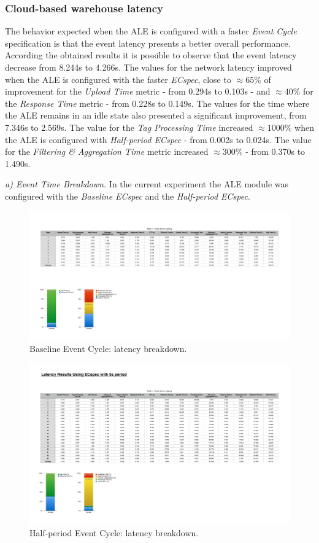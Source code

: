 \subsubsection{Cloud-based warehouse latency}
\label{subs:eval_exp_latency_ecspec_fast}
The behavior expected when the \gls{ALE} is configured with a faster \textit{Event Cycle} specification
is that the event latency presents a better overall performance. According the obtained results it is possible
to observe that the event latency decrease from 8.244s to 4.266s. The values for the network latency
improved when the \gls{ALE} is configured with the faster \textit{ECspec}, close to $\approx65\%$ of
improvement for the \textit{Upload Time} metric - from 0.294s to 0.103s - and $\approx40\%$ for the
\textit{Response Time} metric - from 0.228s to 0.149s. The values for the time where the \gls{ALE}
remains in an idle state also presented a significant improvement, from 7.346s to 2.569s. The value
for the \textit{Tag Processing Time} increased $\approx1000\%$ when the \gls{ALE} is configured with
\textit{Half-period ECspec} - from 0.002s to 0.024s. The value for the \textit{Filtering \& Aggregation Time}
metric increased $\approx300\%$ - from 0.370s to 1.490s.

\textit{a) Event Time Breakdown.}
In the current experiment the \gls{ALE} module was configured with the \textit{Baseline ECspec} and
the \textit{Half-period ECspec}.

\begin{figure}[ht!]
  \centering
  \includegraphics[width=.55\linewidth]{./figures/cloud_ecspec_breakdown}
  \caption{Baseline Event Cycle: latency breakdown.}
  \label{fig:ecspecf_base}
\end{figure}

\begin{figure}[ht!]
  \centering
  \includegraphics[width=.55\linewidth]{./figures/cloud_ecspecf_breakdown}
  \caption{Half-period Event Cycle: latency breakdown.}
  \label{fig:ecspecf_half}
\end{figure}

